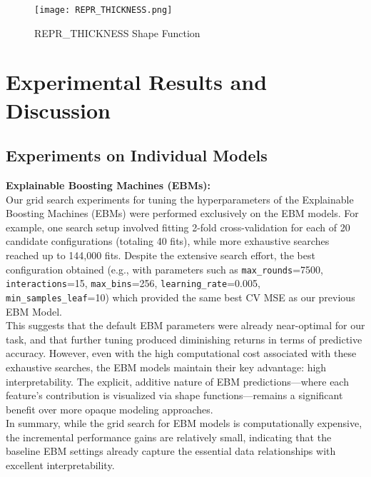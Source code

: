 \documentclass{article}
\begin{document}
\begin{figure}[H]
   \centering
   \texttt{[image: REPR\_THICKNESS.png]}
   \caption{REPR\_THICKNESS Shape Function}
   \label{fig:REPR_THICKNESS}
\end{figure}


\section{Experimental Results and Discussion}

\subsection{Experiments on Individual Models}
\textbf{Explainable Boosting Machines (EBMs):} \\
Our grid search experiments for tuning the hyperparameters of the Explainable Boosting Machines (EBMs) were performed exclusively on the EBM models. For example, one search setup involved fitting 2-fold cross-validation for each of 20 candidate configurations (totaling 40 fits), while more exhaustive searches reached up to 144,000 fits. Despite the extensive search effort, the best configuration obtained (e.g., with parameters such as \texttt{max\_rounds}=7500, \texttt{interactions}=15, \texttt{max\_bins}=256, \texttt{learning\_rate}=0.005, \texttt{min\_samples\_leaf}=10) which provided the same best CV MSE as our previous EBM Model. \\

This suggests that the default EBM parameters were already near-optimal for our task, and that further tuning produced diminishing returns in terms of predictive accuracy. However, even with the high computational cost associated with these exhaustive searches, the EBM models maintain their key advantage: high interpretability. The explicit, additive nature of EBM predictions—where each feature's contribution is visualized via shape functions—remains a significant benefit over more opaque modeling approaches. \\

In summary, while the grid search for EBM models is computationally expensive, the incremental performance gains are relatively small, indicating that the baseline EBM settings already capture the essential data relationships with excellent interpretability. \\

\bigskip
\end{document}

